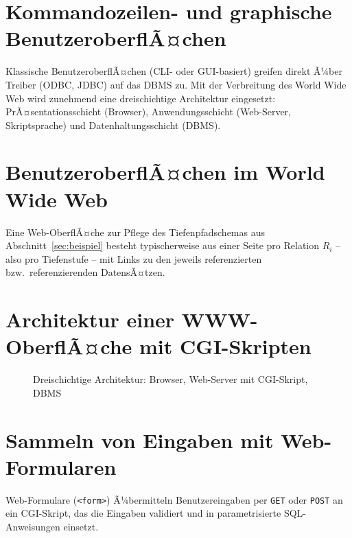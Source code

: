 ﻿\documentclass[a4paper,12pt]{report}
\theoremstyle{definition}
\theoremstyle{remark}
\begin{document}
\section{Kommandozeilen- und graphische BenutzeroberflÃ¤chen}

Klassische BenutzeroberflÃ¤chen (CLI- oder GUI-basiert) greifen direkt
Ã¼ber Treiber (ODBC, JDBC) auf das DBMS zu. Mit der Verbreitung des
World Wide Web wird zunehmend eine dreischichtige Architektur
eingesetzt: PrÃ¤sentationsschicht (Browser), Anwendungsschicht
(Web-Server, Skriptsprache) und Datenhaltungsschicht (DBMS).

\section{BenutzeroberflÃ¤chen im World Wide Web}

Eine Web-OberflÃ¤che zur Pflege des Tiefenpfadschemas aus
Abschnitt~\ref{sec:beispiel} besteht typischerweise aus
einer Seite pro Relation $R_i$ -- also pro Tiefenstufe -- mit Links zu
den jeweils referenzierten bzw.\ referenzierenden DatensÃ¤tzen.

\section{Architektur einer WWW-OberflÃ¤che mit CGI-Skripten}

\begin{figure}[H]
\centering
{}
\caption{Dreischichtige Architektur: Browser, Web-Server mit CGI-Skript, DBMS}
\end{figure}

\section{Sammeln von Eingaben mit Web-Formularen}

Web-Formulare (\texttt{<form>}) Ã¼bermitteln Benutzereingaben per
\texttt{GET} oder \texttt{POST} an ein CGI-Skript, das die Eingaben
validiert und in parametrisierte SQL-Anweisungen einsetzt.
\end{document}
